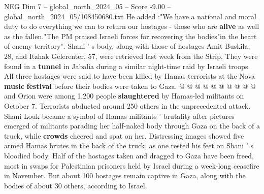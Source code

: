 \begin{textsample}{NEG Dim 7 – global\_north\_2024\_05 – Score -9.00 – global\_north\_2024\_05/108450680.txt}
He added :"We have a national and moral duty to do everything we can to return our hostages - those who are \textbf{alive} as well as the fallen."The PM praised Israeli forces for recovering the bodies"in the heart of enemy territory".
Shani ' s body, along with those of hostages Amit Buskila, 28, and Itzhak Gelerenter, 57, were retrieved last week from the Strip.
They were found in a \textbf{tunnel} in Jabalia during a similar night-time raid by Israeli troops.
All three hostages were said to have been killed by Hamas terrorists at the Nova \textbf{music} \textbf{festival} before their bodies were taken to Gaza. @ @ @ @ @ @ @ @ @ @ and Orion were among 1,200 people \textbf{slaughtered} by Hamas-led militants on October 7.
Terrorists abducted around 250 others in the unprecedented attack.
Shani Louk became a symbol of Hamas militants ' brutality after pictures emerged of militants parading her half-naked body through Gaza on the back of a truck, while \textbf{crowds} cheered and spat on her.
Distressing images showed five armed Hamas brutes in the back of the truck, as one rested his feet on Shani ' s bloodied body.
Half of the hostages taken and dragged to Gaza have been freed, most in swaps for Palestinian prisoners held by Israel during a week-long ceasefire in November.
But about 100 hostages remain captive in Gaza, along with the bodies of about 30 others, according to Israel.

\end{textsample}
